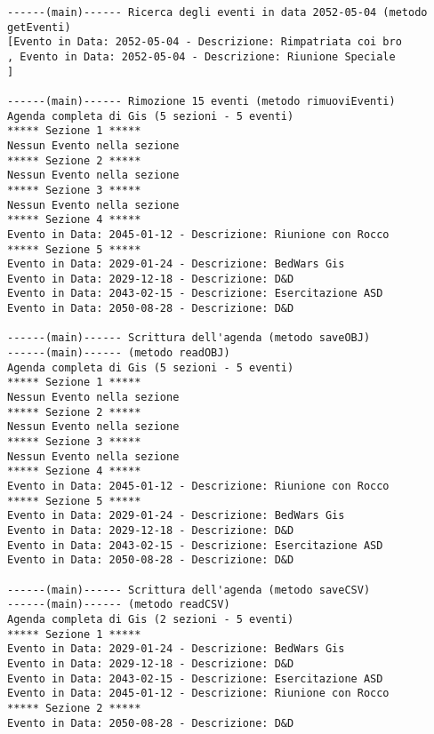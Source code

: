 \documentclass[12pt, a4paper]{article}
\begin{document}
{\begin{lstlisting}
------(main)------ Ricerca degli eventi in data 2052-05-04 (metodo getEventi)
[Evento in Data: 2052-05-04 - Descrizione: Rimpatriata coi bro
, Evento in Data: 2052-05-04 - Descrizione: Riunione Speciale
]

------(main)------ Rimozione 15 eventi (metodo rimuoviEventi)
Agenda completa di Gis (5 sezioni - 5 eventi)
***** Sezione 1 *****
Nessun Evento nella sezione
***** Sezione 2 *****
Nessun Evento nella sezione
***** Sezione 3 *****
Nessun Evento nella sezione
***** Sezione 4 *****
Evento in Data: 2045-01-12 - Descrizione: Riunione con Rocco
***** Sezione 5 *****
Evento in Data: 2029-01-24 - Descrizione: BedWars Gis
Evento in Data: 2029-12-18 - Descrizione: D&D
Evento in Data: 2043-02-15 - Descrizione: Esercitazione ASD
Evento in Data: 2050-08-28 - Descrizione: D&D

------(main)------ Scrittura dell'agenda (metodo saveOBJ)
------(main)------ (metodo readOBJ)
Agenda completa di Gis (5 sezioni - 5 eventi)
***** Sezione 1 *****
Nessun Evento nella sezione
***** Sezione 2 *****
Nessun Evento nella sezione
***** Sezione 3 *****
Nessun Evento nella sezione
***** Sezione 4 *****
Evento in Data: 2045-01-12 - Descrizione: Riunione con Rocco
***** Sezione 5 *****
Evento in Data: 2029-01-24 - Descrizione: BedWars Gis
Evento in Data: 2029-12-18 - Descrizione: D&D
Evento in Data: 2043-02-15 - Descrizione: Esercitazione ASD
Evento in Data: 2050-08-28 - Descrizione: D&D

------(main)------ Scrittura dell'agenda (metodo saveCSV)
------(main)------ (metodo readCSV)
Agenda completa di Gis (2 sezioni - 5 eventi)
***** Sezione 1 *****
Evento in Data: 2029-01-24 - Descrizione: BedWars Gis
Evento in Data: 2029-12-18 - Descrizione: D&D
Evento in Data: 2043-02-15 - Descrizione: Esercitazione ASD
Evento in Data: 2045-01-12 - Descrizione: Riunione con Rocco
***** Sezione 2 *****
Evento in Data: 2050-08-28 - Descrizione: D&D
\end{lstlisting}}
\end{document}
